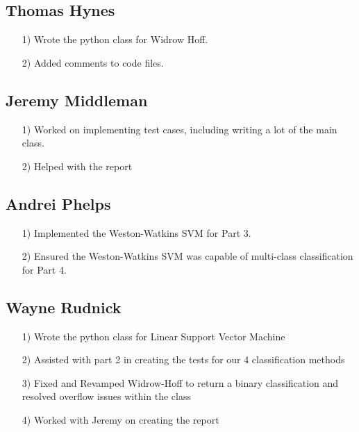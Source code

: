 \documentclass{article}
\begin{document}
\subsection{Thomas Hynes}
\begin{itemize}
    \item[1)] Wrote the python class for Widrow Hoff.
    \item[2)] Added comments to code files.
\end{itemize}

\subsection{Jeremy Middleman}
\begin{itemize}
    \item[1)] Worked on implementing test cases, including writing a lot of the main class.
    \item[2)] Helped with the report
\end{itemize}

\subsection{Andrei Phelps}
\begin{itemize}
    \item[1)] Implemented the Weston-Watkins SVM for Part 3.
    \item[2)] Ensured the Weston-Watkins SVM was capable of multi-class classification for Part 4. 
\end{itemize}

\subsection{Wayne Rudnick}
\begin{itemize}
    \item[1)] Wrote the python class for Linear Support Vector Machine
    \item[2)] Assisted with part 2 in creating the tests for our 4 classification methods
    \item[3)] Fixed and Revamped Widrow-Hoff to return a binary classification and resolved overflow issues within the class
    \item[4)] Worked with Jeremy on creating the report
\end{itemize}
\end{document}
